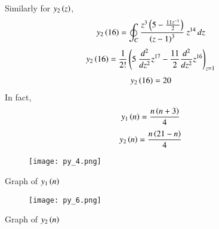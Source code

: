 \documentclass[beamer]{IEEEtran}
\theoremstyle{remark}
\begin{document}
Similarly for $y_2\left(z\right)$,
\begin{align}
y_2\left(16\right)&=\oint_C \frac{z^3\left(5-\frac{11z^{-1}}{2}\right)}{\left(z-1\right)^3}\ z^{14}\, dz
\end{align}
\begin{align}
y_2\brak{16}&=\frac{1}{2!}\brak{5\ \frac{d^2}{dz^2}z^{17}-\frac{11}{2}\frac{d^2}{dz^2}z^{16}}_{z=1}  
\end{align}
\begin{align}
y_2\left(16\right)&=20
\end{align}
In fact,
\begin{align}
y_1\left(n\right)&=\frac{n\left(n+3\right)}{4}
\end{align}
\begin{align}
y_2\left(n\right)&=\frac{n\left(21-n\right)}{4}
\end{align}
\begin{figure}[h]
    \centering
    \texttt{[image: py\_4.png]}
    \label{fig:s1n}
\end{figure}
\begin{center}
    Graph of $y_1\left(n\right)$\\[30ex]
\end{center}
\begin{figure}[h]
    \centering
    \texttt{[image: py\_6.png]}
    \label{s2n}
\end{figure}
\begin{center}
Graph of $y_2\left(n\right)$
\end{center}
\end{document}
